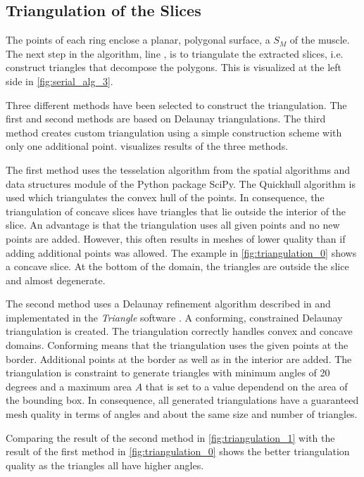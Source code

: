 \subsection{Triangulation of the Slices}\label{sec:triangulation_of_the_slices}
The points of each ring enclose a planar, polygonal surface, a  $S_M$ of the muscle.
The next step in the algorithm, line , is to triangulate the extracted slices, i.e. construct triangles that decompose the polygons. This is visualized at the left side in \cref{fig:serial_alg_3}.

Three different methods have been selected to construct the triangulation. The first and second methods are based on Delaunay triangulations. The third method creates custom triangulation using a simple construction scheme with only one additional point.
 visualizes results of the three methods.

The first method uses the tesselation algorithm from the spatial algorithms and data structures module of the Python package SciPy. 
The Quickhull algorithm \cite{quickhull} is used which triangulates the convex hull of the points. In consequence, the triangulation of concave slices have triangles that lie outside the interior of the slice. An advantage is that the triangulation uses all given points and no new points are added. However, this often results in meshes of lower quality than if adding additional points was allowed.
The example in \cref{fig:triangulation_0} shows a concave slice. At the bottom of the domain, the triangles are outside the slice and almost degenerate.

The second method uses a Delaunay refinement algorithm described in \cite{Delaunay2002} and implementated in the \emph{Triangle} software \cite{shewchuk96b}. A conforming, constrained Delaunay triangulation is created. The triangulation correctly handles convex and concave domains.
Conforming means that the triangulation uses the given points at the border. Additional points at the border as well as in the interior are added. The triangulation is constraint to generate triangles with minimum angles of 20 degrees and a maximum area $A$ that is set to a value dependend on the area of the bounding box. In consequence, all generated triangulations have a guaranteed mesh quality in terms of angles and about the same size and number of triangles.

Comparing the result of the second method in \cref{fig:triangulation_1} with the result of the first method in \cref{fig:triangulation_0} shows the better triangulation quality as the triangles all have higher angles.

